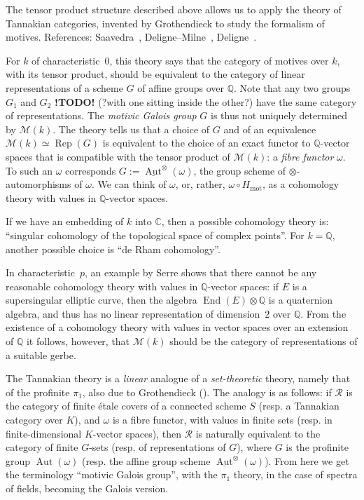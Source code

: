 \documentclass{article}
\theoremstyle{plain}
\theoremstyle{definition}
\newcommand{\sh}{\mathscr}
\newcommand{\QQ}{\mathbb{Q}}
\newcommand{\CC}{\mathbb{C}}
\newcommand{\mot}{\mathrm{mot}}
\DeclareMathOperator{\End}{End}
\DeclareMathOperator{\Aut}{Aut}
\DeclareMathOperator{\Rep}{Rep}
\newcommand{\todo}{\textbf{ !TODO! }}
\newcommand{\oldpage}[1]{\marginpar{\footnotesize$\Big\vert$ \textit{p.~#1}}}
\begin{document}
The tensor product structure described above allows us to apply the theory of Tannakian categories, invented by Grothendieck to study the formalism of motives.
References: Saavedra~\cite{28}, Deligne--Milne~\cite{12}, Deligne~\cite{15}.

For $k$ of characteristic~$0$, this theory says that the category of motives over $k$, with its tensor product, should be equivalent to the category of linear representations of a scheme $G$ of affine groups over $\QQ$.
Note that any two groups $G_1$ and $G_2$ \todo(?with one sitting inside the other?) have the same category of representations.
The \emph{motivic Galois group} $G$ is thus not uniquely determined by $\sh{M}(k)$.
The theory tells us that a choice of $G$ and of an equivalence $\sh{M}(k)\simeq\Rep(G)$ is equivalent to the choice of an exact functor to $\QQ$-vector spaces that is compatible with the tensor product of $\sh{M}(k)$: a \emph{fibre functor} $\omega$.
To such an $\omega$ corresponds $G:=\underline{\Aut}^\otimes(\omega)$, the group scheme of $\otimes$-automorphisms of $\omega$.
We can think of $\omega$, or, rather, $\omega\circ H_\mot$, as a cohomology theory with values in $\QQ$-vector spaces.

\oldpage{146}
If we have an embedding of $k$ into $\CC$, then a possible cohomology theory is: ``singular cohomology of the topological space of complex points''.
For $k=\QQ$, another possible choice is ``de Rham cohomology''.

In characteristic~$p$, an example by Serre shows that there cannot be any reasonable cohomology theory with values in $\QQ$-vector spaces: if $E$ is a supersingular elliptic curve, then the algebra $\End(E)\otimes\QQ$ is a quaternion algebra, and thus has no linear representation of dimension~$2$ over $\QQ$.
From the existence of a cohomology theory with values in vector spaces over an extension of $\QQ$ it follows, however, that $\sh{M}(k)$ should be the category of representations of a suitable gerbe.

The Tannakian theory is a \emph{linear} analogue of a \emph{set-theoretic} theory, namely that of the profinite $\pi_1$, also due to Grothendieck (\cite{SGA1}).
The analogy is as follows: if $\sh{R}$ is the category of finite \'{e}tale covers of a connected scheme $S$ (resp. a Tannakian category over $K$), and $\omega$ is a fibre functor, with values in finite sets (resp. in finite-dimensional $K$-vector spaces), then $\sh{R}$ is naturally equivalent to the category of finite $G$-sets (resp. of representations of $G$), where $G$ is the profinite group $\Aut(\omega)$ (resp. the affine group scheme $\underline{\Aut}^\otimes(\omega)$).
From here we get the terminology ``motivic Galois group'', with the $\pi_1$ theory, in the case of spectra of fields, becoming the Galois version.
\end{document}
